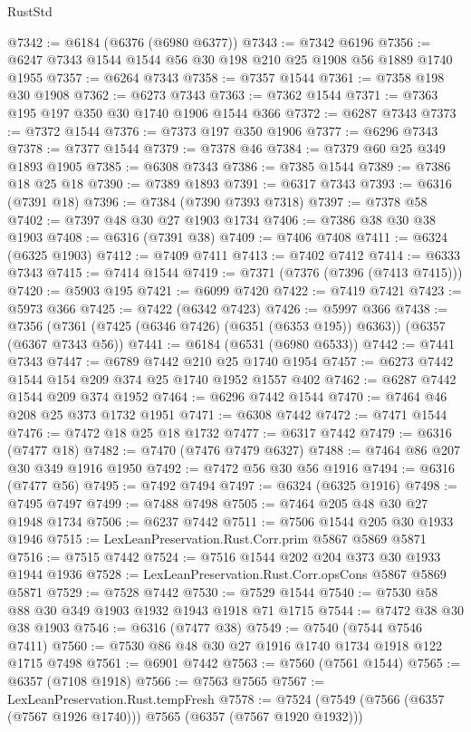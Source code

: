 \begin{lexlean}{RustStd}
\begin{coremodule}
@7342 := @6184 (@6376 (@6980 @6377))
@7343 := @7342 @6196
@7356 := @6247 @7343 @1544 @1544 @56 @30 @198 @210 @25 @1908 @56 @1889 @1740 @1955
@7357 := @6264 @7343
@7358 := @7357 @1544
@7361 := @7358 @198 @30 @1908
@7362 := @6273 @7343
@7363 := @7362 @1544
@7371 := @7363 @195 @197 @350 @30 @1740 @1906 @1544 @366
@7372 := @6287 @7343
@7373 := @7372 @1544
@7376 := @7373 @197 @350 @1906
@7377 := @6296 @7343
@7378 := @7377 @1544
@7379 := @7378 @46
@7384 := @7379 @60 @25 @349 @1893 @1905
@7385 := @6308 @7343
@7386 := @7385 @1544
@7389 := @7386 @18 @25 @18
@7390 := @7389 @1893
@7391 := @6317 @7343
@7393 := @6316 (@7391 @18)
@7396 := @7384 (@7390 @7393 @7318)
@7397 := @7378 @58
@7402 := @7397 @48 @30 @27 @1903 @1734
@7406 := @7386 @38 @30 @38 @1903
@7408 := @6316 (@7391 @38)
@7409 := @7406 @7408
@7411 := @6324 (@6325 @1903)
@7412 := @7409 @7411
@7413 := @7402 @7412
@7414 := @6333 @7343
@7415 := @7414 @1544
@7419 := @7371 (@7376 (@7396 (@7413 @7415)))
@7420 := @5903 @195
@7421 := @6099 @7420
@7422 := @7419 @7421
@7423 := @5973 @366
@7425 := @7422 (@6342 @7423)
@7426 := @5997 @366
@7438 := @7356 (@7361 (@7425 (@6346 @7426) (@6351 (@6353 @195)) @6363)) (@6357 (@6367 @7343 @56))
@7441 := @6184 (@6531 (@6980 @6533))
@7442 := @7441 @7343
@7447 := @6789 @7442 @210 @25 @1740 @1954
@7457 := @6273 @7442 @1544 @154 @209 @374 @25 @1740 @1952 @1557 @402
@7462 := @6287 @7442 @1544 @209 @374 @1952
@7464 := @6296 @7442 @1544
@7470 := @7464 @46 @208 @25 @373 @1732 @1951
@7471 := @6308 @7442
@7472 := @7471 @1544
@7476 := @7472 @18 @25 @18 @1732
@7477 := @6317 @7442
@7479 := @6316 (@7477 @18)
@7482 := @7470 (@7476 @7479 @6327)
@7488 := @7464 @86 @207 @30 @349 @1916 @1950
@7492 := @7472 @56 @30 @56 @1916
@7494 := @6316 (@7477 @56)
@7495 := @7492 @7494
@7497 := @6324 (@6325 @1916)
@7498 := @7495 @7497
@7499 := @7488 @7498
@7505 := @7464 @205 @48 @30 @27 @1948 @1734
@7506 := @6237 @7442
@7511 := @7506 @1544 @205 @30 @1933 @1946
@7515 := LexLeanPreservation.Rust.Corr.prim @5867 @5869 @5871
@7516 := @7515 @7442
@7524 := @7516 @1544 @202 @204 @373 @30 @1933 @1944 @1936
@7528 := LexLeanPreservation.Rust.Corr.opsCons @5867 @5869 @5871
@7529 := @7528 @7442
@7530 := @7529 @1544
@7540 := @7530 @58 @88 @30 @349 @1903 @1932 @1943 @1918 @71 @1715
@7544 := @7472 @38 @30 @38 @1903
@7546 := @6316 (@7477 @38)
@7549 := @7540 (@7544 @7546 @7411)
@7560 := @7530 @86 @48 @30 @27 @1916 @1740 @1734 @1918 @122 @1715 @7498
@7561 := @6901 @7442
@7563 := @7560 (@7561 @1544)
@7565 := @6357 (@7108 @1918)
@7566 := @7563 @7565
@7567 := LexLeanPreservation.Rust.tempFresh
@7578 := @7524 (@7549 (@7566 (@6357 (@7567 @1926 @1740))) @7565 (@6357 (@7567 @1920 @1932)))

\end{coremodule}
\end{lexlean}
